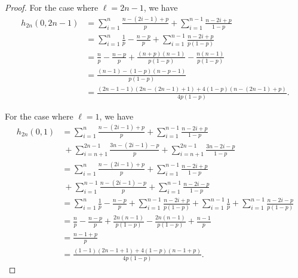 \documentclass[12pt, leqno]{amsart}
\numberwithin{equation}{section}
\theoremstyle{plain}
\theoremstyle{definition}
\newcommand{\0}{\mathbf{0}}
\begin{document}
\begin{proof}
For the case where $\ell=2n-1$, we have
\begin{align*}
h_{2n}(0,2n-1)%
&=\sum_{i=1}^n\frac{n-(2i-1)+p}{p}+\sum_{i=1}^{n-1}\frac{n-2i+p}{1-p}\\
&=\sum_{i=1}^n\frac{1}{p}-\frac{n-p}{p}+\sum_{i=1}^{n-1}\frac{n-2i+p}{p(1-p)}\\
&=\frac{n}{p}-\frac{n-p}{p}+\frac{(n+p)(n-1)}{p(1-p)}-\frac{n(n-1)}{p(1-p)}\\
&=\frac{(n-1)-(1-p)(n-p-1)}{p(1-p)} \\
&=\frac{(2n-1-1)(2n-(2n-1)+1)+4(1-p)(n-(2n-1)+p)}{4p(1-p)}.
\end{align*}

For the case where $\ell=1$, we have
\begin{align*}
h_{2n}(0,1)&=\sum_{i=1}^n\frac{n-(2i-1)+p}{p}+\sum_{i=1}^{n-1}\frac{n-2i+p}{1-p}\\
&~+\sum_{i=n+1}^{2n-1}\frac{3n-(2i-1)-p}{p}+\sum_{i=n+1}^{2n-1}\frac{3n-2i-p}{1-p}\\
&=\sum_{i=1}^n\frac{n-(2i-1)+p}{p}+\sum_{i=1}^{n-1}\frac{n-2i+p}{1-p}\\
&~+\sum_{i=1}^{n-1}\frac{n-(2i-1)-p}{p}+\sum_{i=1}^{n-1}\frac{n-2i-p}{1-p}\\
&=\sum_{i=1}^n\frac{1}{p}-\frac{n-p}{p}+\sum_{i=1}^{n-1}\frac{n-2i+p}{p(1-p)}+\sum_{i=1}^{n-1}\frac{1}{p}+\sum_{i=1}^{n-1}\frac{n-2i-p}{p(1-p)}\\
&=\frac{n}{p}-\frac{n-p}{p}+\frac{2n(n-1)}{p(1-p)}-\frac{2n(n-1)}{p(1-p)}+\frac{n-1}{p}\\
&=\frac{n-1+p}{p}\\
&=\frac{(1-1)(2n-1+1)+4(1-p)(n-1+p)}{4p(1-p)}.
\end{align*}


\end{proof}
\end{document}
